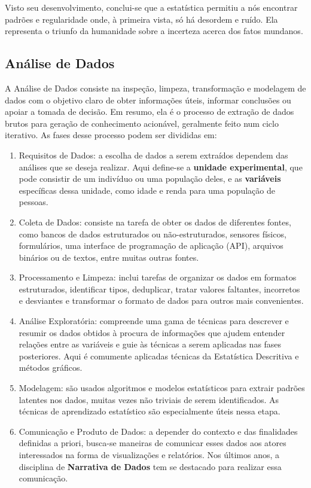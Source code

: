 Visto seu desenvolvimento, conclui-se que a estatística permitiu a nós encontrar padrões e
regularidade onde, à primeira vista, só há desordem e ruído.
Ela representa o triunfo da humanidade sobre a incerteza acerca dos fatos mundanos.

\subsection*{Análise de Dados}

A Análise de Dados consiste na inspeção, limpeza, transformação e modelagem de dados
com o objetivo claro de obter informações úteis, informar conclusões ou apoiar a
tomada de decisão. Em resumo, ela é o processo de extração de dados brutos para
geração de conhecimento acionável, geralmente feito num ciclo iterativo. As fases desse
processo podem ser divididas em:

\begin{enumerate}
	\item Requisitos de Dados: a escolha de dados a serem extraídos dependem das
	      análises que se deseja realizar. Aqui define-se a \textbf{unidade experimental},
	      que pode consistir de um indivíduo ou uma população deles, e as \textbf{variáveis}
	      específicas dessa unidade, como idade e renda para uma população de pessoas.

	\item Coleta de Dados: consiste na tarefa de obter os dados de diferentes fontes,
	      como bancos de dados estruturados ou não-estruturados, sensores físicos, formulários,
	      uma interface de programação de aplicação (API), arquivos binários ou de textos, entre
	      muitas outras fontes.

	\item Processamento e Limpeza: inclui tarefas de organizar os dados em formatos
	      estruturados, identificar tipos, deduplicar, tratar valores faltantes, incorretos
	      e desviantes e transformar o formato de dados para outros mais convenientes.

	\item Análise Exploratória: compreende uma gama de técnicas para descrever e resumir
	      os dados obtidos à procura de informações que ajudem entender relações entre as
	      variáveis e guie às técnicas a serem aplicadas nas fases posteriores. Aqui
	      é comumente aplicadas técnicas da Estatística Descritiva e métodos gráficos.

	\item Modelagem: são usados algoritmos e modelos estatísticos para extrair padrões
	      latentes nos dados, muitas vezes não triviais de serem identificados. As
	      técnicas de aprendizado estatístico são especialmente úteis nessa etapa.

	\item Comunicação e Produto de Dados: a depender do contexto e das finalidades definidas
	      a priori, busca-se maneiras de comunicar esses dados aos atores interessados na
	      forma de visualizações e relatórios. Nos últimos anos, a disciplina de
	      \textbf{Narrativa de Dados} tem se destacado para realizar essa comunicação.
\end{enumerate}

